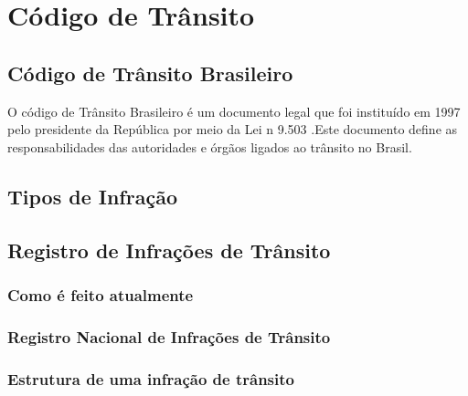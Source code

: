 \section{Código de Trânsito}

\subsection{Código de Trânsito Brasileiro}

O código de Trânsito Brasileiro é um documento legal que foi instituído em 1997 pelo presidente da República por meio da Lei n 9.503 .Este documento define as responsabilidades das autoridades e órgãos ligados ao trânsito no Brasil.

\subsection{Tipos de Infração}

\subsection{Registro de Infrações de Trânsito}

    \subsubsection{Como é feito atualmente}

    \subsubsection{Registro Nacional de Infrações de Trânsito}

    \subsubsection{Estrutura de uma infração de trânsito}